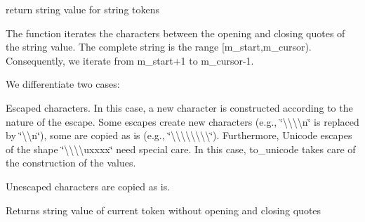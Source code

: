 return string value for string tokens 

The function iterates the characters between the opening and closing quotes of the string value. The complete string is the range \mbox{[}m\-\_\-start,m\-\_\-cursor). Consequently, we iterate from m\-\_\-start+1 to m\-\_\-cursor-\/1.

We differentiate two cases\-:


\begin{DoxyEnumerate}
\item Escaped characters. In this case, a new character is constructed according to the nature of the escape. Some escapes create new characters (e.\-g., {\ttfamily \char`\"{}\textbackslash{}\textbackslash{}\textbackslash{}\textbackslash{}n\char`\"{}} is replaced by {\ttfamily \char`\"{}\textbackslash{}\textbackslash{}n\char`\"{}}), some are copied as is (e.\-g., {\ttfamily \char`\"{}\textbackslash{}\textbackslash{}\textbackslash{}\textbackslash{}\textbackslash{}\textbackslash{}\textbackslash{}\textbackslash{}\char`\"{}}). Furthermore, Unicode escapes of the shape {\ttfamily \char`\"{}\textbackslash{}\textbackslash{}\textbackslash{}\textbackslash{}uxxxx\char`\"{}} need special care. In this case, to\-\_\-unicode takes care of the construction of the values.
\item Unescaped characters are copied as is.
\end{DoxyEnumerate}

\begin{DoxyReturn}{Returns}
string value of current token without opening and closing quotes 
\end{DoxyReturn}

